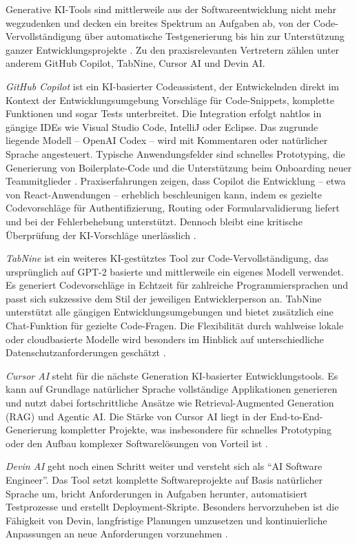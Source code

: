 
Generative KI-Tools sind mittlerweile aus der Softwareentwicklung nicht mehr
wegzudenken und decken ein breites Spektrum an Aufgaben ab, von der
Code-Vervollständigung über automatische Testgenerierung bis hin zur
Unterstützung ganzer Entwicklungsprojekte \cite{donvir_role_2024}. Zu den
praxisrelevanten Vertretern zählen unter anderem GitHub Copilot, TabNine,
Cursor AI und Devin AI.

\textit{GitHub Copilot}
ist ein KI-basierter Codeassistent, der Entwickelnden direkt im Kontext der
Entwicklungsumgebung Vorschläge für Code-Snippets, komplette Funktionen und
sogar Tests unterbreitet. Die Integration erfolgt nahtlos in gängige IDEs wie
Visual Studio Code, IntelliJ oder Eclipse. Das zugrunde liegende Modell –
OpenAI Codex – wird mit Kommentaren oder natürlicher Sprache angesteuert.
Typische Anwendungsfelder sind schnelles Prototyping, die Generierung von
Boilerplate-Code und die Unterstützung beim Onboarding neuer Teammitglieder
\cite{donvir_role_2024}. Praxiserfahrungen zeigen, dass Copilot die Entwicklung
– etwa von React-Anwendungen – erheblich beschleunigen kann, indem es gezielte
Codevorschläge für Authentifizierung, Routing oder Formularvalidierung liefert
und bei der Fehlerbehebung unterstützt. Dennoch bleibt eine kritische
Überprüfung der KI-Vorschläge unerlässlich \cite{kerr_github_nodate}.

\textit{TabNine}
ist ein weiteres KI-gestütztes Tool zur Code-Vervollständigung, das
ursprünglich auf GPT-2 basierte und mittlerweile ein eigenes Modell verwendet.
Es generiert Codevorschläge in Echtzeit für zahlreiche Programmiersprachen und
passt sich sukzessive dem Stil der jeweiligen Entwicklerperson an. TabNine
unterstützt alle gängigen Entwicklungsumgebungen und bietet zusätzlich eine
Chat-Funktion für gezielte Code-Fragen. Die Flexibilität durch wahlweise lokale
oder cloudbasierte Modelle wird besonders im Hinblick auf unterschiedliche
Datenschutzanforderungen geschätzt \cite{donvir_role_2024}.

\textit{Cursor AI}
steht für die nächste Generation KI-basierter Entwicklungstools. Es kann auf
Grundlage natürlicher Sprache vollständige Applikationen generieren und nutzt
dabei fortschrittliche Ansätze wie Retrieval-Augmented Generation (RAG) und
Agentic AI. Die Stärke von Cursor AI liegt in der End-to-End-Generierung
kompletter Projekte, was insbesondere für schnelles Prototyping oder den Aufbau
komplexer Softwarelösungen von Vorteil ist \cite{donvir_role_2024}.

\textit{Devin AI}
geht noch einen Schritt weiter und versteht sich als \enquote{AI Software
    Engineer}. Das Tool setzt komplette Softwareprojekte auf Basis natürlicher
Sprache um, bricht Anforderungen in Aufgaben herunter, automatisiert
Testprozesse und erstellt Deployment-Skripte. Besonders hervorzuheben ist die
Fähigkeit von Devin, langfristige Planungen umzusetzen und kontinuierliche
Anpassungen an neue Anforderungen vorzunehmen \cite{donvir_role_2024}.

